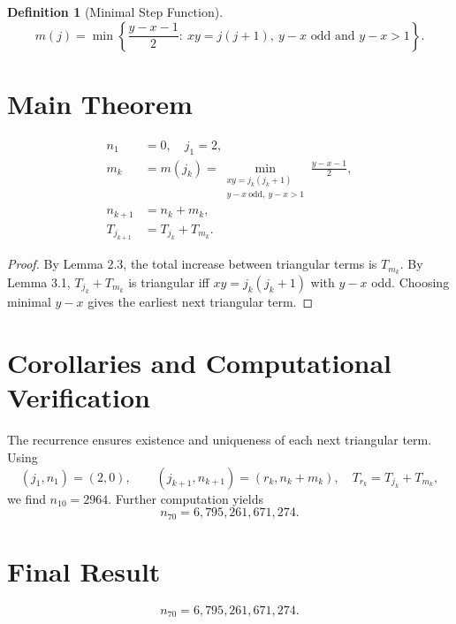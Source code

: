 \documentclass[12pt]{article}
\theoremstyle{definition}
\newtheorem{definition}{Definition}[section]
\begin{document}
\begin{definition}[Minimal Step Function]
    \[
        m(j) = \min \left\{
        \frac{y - x - 1}{2}
        :\ xy = j(j+1),\ y-x\text{ odd and }y-x > 1
        \right\}.
    \]
\end{definition}

\section{Main Theorem}

\[
    \boxed{
        \begin{aligned}
            n_1         & = 0, \quad j_1 = 2,  \\[4pt]
            m_k         & = m(j_k)
            = \min_{\substack{xy=j_k(j_k+1)    \\ y-x\ \text{odd},\ y-x>1}}
            \frac{y-x-1}{2},                   \\[6pt]
            n_{k+1}     & = n_k + m_k,         \\[4pt]
            T_{j_{k+1}} & = T_{j_k} + T_{m_k}.
        \end{aligned}
    }
\]

\begin{proof}
    By Lemma 2.3, the total increase between triangular terms is $T_{m_k}$.
    By Lemma 3.1, $T_{j_k} + T_{m_k}$ is triangular iff $xy = j_k(j_k+1)$ with $y - x$ odd.
    Choosing minimal $y-x$ gives the earliest next triangular term.
\end{proof}

\section{Corollaries and Computational Verification}
The recurrence ensures existence and uniqueness of each next triangular term.
Using
\[
    (j_1,n_1) = (2,0), \qquad
    (j_{k+1},n_{k+1}) = (r_k, n_k + m_k), \quad
    T_{r_k} = T_{j_k} + T_{m_k},
\]
we find $n_{10}=2964$. Further computation yields
\[
    n_{70} = 6{,}795{,}261{,}671{,}274.
\]

\section*{Final Result}
\[
    \boxed{n_{70} = 6{,}795{,}261{,}671{,}274.}
\]
\end{document}
